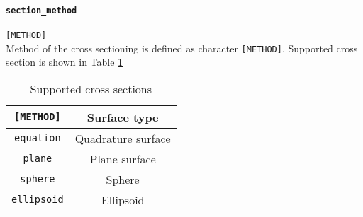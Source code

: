 \paragraph{\tt section\_method}
\label{href_t:section_method}
\verb|[METHOD]| \\
Method of the cross sectioning is defined as character \verb|[METHOD]|. Supported cross section is shown in Table \ref{table:surface_list}
%
\begin{table}[htp]
\caption{Supported cross sections}
\begin{center}
\begin{tabular}{|c|c|}
\hline
\verb|[METHOD]| & Surface type \\ \hline
\verb|equation| & Quadrature surface \\
\verb|plane| & Plane surface \\
\verb|sphere| & Sphere \\
\verb|ellipsoid| & Ellipsoid  \\
\hline
\end{tabular}
\end{center}
\label{table:surface_list}
\end{table}
%

